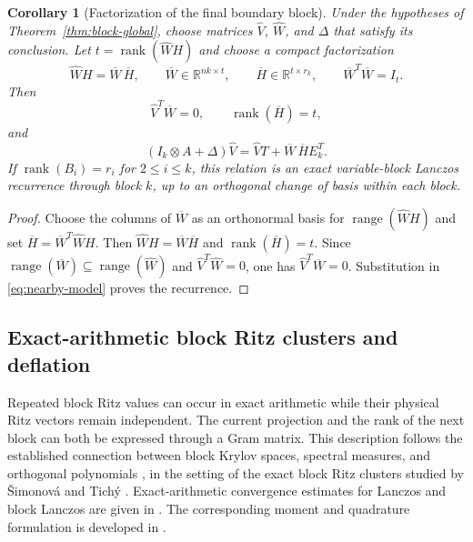 \documentclass[11pt]{article}
\newtheorem{corollary}{Corollary}
\theoremstyle{definition}
\newcommand{\R}{\mathbb{R}}
\begin{document}
\begin{corollary}[Factorization of the final boundary block]
\label{cor:block-boundary-factorization}
Under the hypotheses of Theorem~\ref{thm:block-global}, choose matrices
$\widehat V$, $\widehat W$, and $\Delta$ that satisfy its conclusion.  Let
$t=\operatorname{rank}(\widehat WH)$ and choose a compact factorization
\[
 \widehat WH=\overline W\,\overline H,
 \qquad
 \overline W\in\R^{nk\times t},
 \qquad
 \overline H\in\R^{t\times r_k},
 \qquad
 \overline W^T\overline W=I_t.
\]
Then
\[
 \widehat V^T\overline W=0,
 \qquad
 \operatorname{rank}(\overline H)=t,
\]
and
\[
 (I_k\otimes A+\Delta)\widehat V
 =\widehat VT+\overline W\,\overline H E_k^T.
\]
If $\operatorname{rank}(B_i)=r_i$ for $2\le i\le k$, this relation is an
exact variable-block Lanczos recurrence through block $k$, up to an
orthogonal change of basis within each block.
\end{corollary}

\begin{proof}
Choose the columns of $\overline W$ as an orthonormal basis for
$\operatorname{range}(\widehat WH)$ and set
$\overline H=\overline W^T\widehat WH$.  Then
$\widehat WH=\overline W\overline H$ and
$\operatorname{rank}(\overline H)=t$.  Since
$\operatorname{range}(\overline W)\subseteq
\operatorname{range}(\widehat W)$ and
$\widehat V^T\widehat W=0$, one has
$\widehat V^T\overline W=0$.  Substitution in
\eqref{eq:nearby-model} proves the recurrence.
\end{proof}

\subsection{Exact-arithmetic block Ritz clusters and deflation}

Repeated block Ritz values can occur in exact arithmetic while their
physical Ritz vectors remain independent.  The current projection and the
rank of the next block can both be expressed through a Gram matrix.
This description follows the established connection between block Krylov
spaces, spectral measures, and orthogonal polynomials
\cite{FenuMartinReichelRodriguez2013,RinelliVandebril2026}, in the setting
of the exact block Ritz clusters studied by \v{S}imonov\'a and Tich\'y
\cite{SimonovaTichy2025}.
Exact-arithmetic convergence estimates for Lanczos and block Lanczos are
given in \cite{Saad1980,LiZhang2015}.  The corresponding moment and
quadrature formulation is developed in \cite{GolubMeurant2010}.
\end{document}
